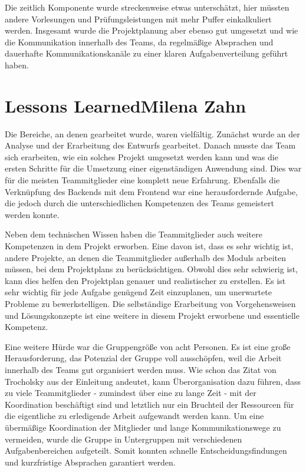 		Die zeitlich Komponente wurde streckenweise etwas unterschätzt, hier müssten andere Vorlesungen und Prüfungsleistungen mit mehr Puffer einkalkuliert werden. Insgesamt wurde die Projektplanung aber ebenso gut umgesetzt und wie die Kommunikation innerhalb des Teams, da regelmäßige Absprachen und dauerhafte Kommunikationskanäle zu einer klaren Aufgabenverteilung geführt haben.
		
	
	\section[Lessons Learned]{Lessons Learned{\hfill \normalsize Milena Zahn}} \label{Ausblick} 
	Die Bereiche, an denen gearbeitet wurde, waren vielfältig. Zunächst wurde an der Analyse und der Erarbeitung des Entwurfs gearbeitet. Danach musste das Team sich erarbeiten, wie ein solches Projekt umgesetzt werden kann und was die ersten Schritte für die Umsetzung einer eigenständigen Anwendung sind. Dies war für die meisten Teammitglieder eine komplett neue Erfahrung. Ebenfalls die Verknüpfung des Backends mit dem Frontend war eine herausfordernde Aufgabe, die jedoch durch die unterschiedlichen Kompetenzen des Teams gemeistert werden konnte. 
	
	Neben dem technischen Wissen haben die Teammitglieder auch weitere Kompetenzen in dem Projekt erworben. Eine davon ist, dass es sehr wichtig ist, andere Projekte, an denen die Teammitglieder außerhalb des Moduls arbeiten müssen, bei dem Projektplans zu berücksichtigen. Obwohl dies sehr schwierig ist, kann dies helfen den Projektplan genauer und realistischer zu erstellen. Es ist sehr wichtig für jede Aufgabe genügend Zeit einzuplanen, um unerwartete Probleme zu bewerkstelligen. Die selbständige Erarbeitung von Vorgehensweisen und Lösungskonzepte ist eine weitere in diesem Projekt erworbene und essentielle Kompetenz.
	
	Eine weitere Hürde war die Gruppengröße von acht Personen. Es ist eine große Herausforderung, das Potenzial der Gruppe voll ausschöpfen, weil die Arbeit innerhalb des Teams gut organisiert werden muss. 
	Wie schon das Zitat von Trocholsky aus der Einleitung andeutet, kann Überorganisation dazu führen, dass zu viele Teammitglieder - zumindest über eine zu lange Zeit - mit der Koordination beschäftigt sind und letztlich nur ein Bruchteil der Ressourcen für die eigentliche zu erledigende Arbeit aufgewandt werden kann.
	Um eine übermäßige Koordination der Mitglieder und lange Kommunikationswege zu vermeiden, wurde die Gruppe in Untergruppen mit verschiedenen Aufgabenbereichen aufgeteilt. Somit konnten schnelle Entscheidungsfindungen und kurzfristige Absprachen garantiert werden. 
	
